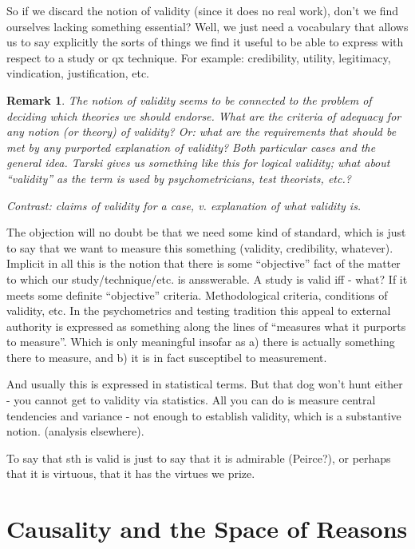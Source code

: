 \documentclass[11pt,twoside]{article}
\newtheorem{remark}{Remark}
\begin{document}
So if we discard the notion of validity (since it does no real work),
don't we find ourselves lacking something essential?  Well, we just
need a vocabulary that allows us to say explicitly the sorts of things
we find it useful to be able to express with respect to a study or qx
technique.  For example: credibility, utility, legitimacy,
vindication, justification, etc.

\begin{remark}
  The notion of validity seems to be connected to the problem of
  deciding which theories we should endorse.  What are the criteria of
  adequacy for any notion (or theory) of validity?  Or: what are the
  requirements that should be met by any purported explanation of
  validity?  Both particular cases and the general idea.  Tarski gives
  us something like this for logical validity; what about ``validity''
  as the term is used by psychometricians, test theorists, etc.?

Contrast: claims of validity for a case, v. explanation of what
validity is.


\end{remark}

The objection will no doubt be that we need some kind of standard,
which is just to say that we want to measure this something (validity,
credibility, whatever).  Implicit in all this is the notion that there
is some ``objective'' fact of the matter to which our
study/technique/etc. is ansswerable. A study is valid iff - what?  If
it meets some definite ``objective'' criteria.  Methodological
criteria, conditions of validity, etc.  In the psychometrics and
testing tradition this appeal to external authority is expressed as
something along the lines of ``measures what it purports to measure''.
Which is only meaningful insofar as a) there is actually something
there to measure, and b) it is in fact susceptibel to measurement.

And usually this is expressed in statistical terms.  But that dog
won't hunt either - you cannot get to validity via statistics.  All
you can do is measure central tendencies and variance - not enough to
establish validity, which is a substantive notion. (analysis
elsewhere).

To say that sth is valid is just to say that it is admirable
(Peirce?), or perhaps that it is virtuous, that it has the virtues we
prize.

\section{Causality and the Space of Reasons}
\end{document}
